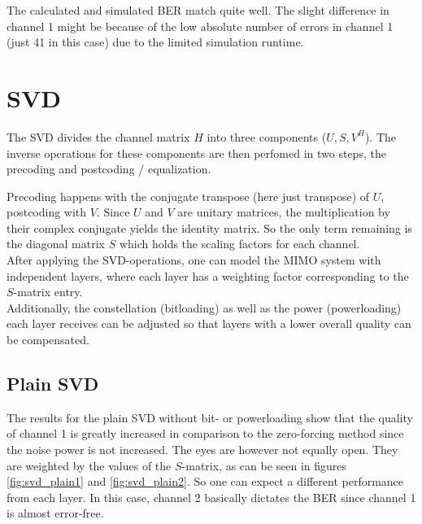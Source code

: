 \documentclass[10pt, a4paper]{article}
\begin{document}
The calculated and simulated BER match quite well. The slight difference in channel 1 might be because of the low absolute number of errors in channel 1 (just 41 in this case) due to the limited simulation runtime.



\section{SVD}
The SVD divides the channel matrix $H$ into three components ($U, S, V^{H}$). The inverse operations for these components are then perfomed in two steps, the precoding and postcoding / equalization.

Precoding happens with the conjugate transpose (here just transpose) of $U$, postcoding with $V$. Since $U$ and $V$ are unitary matrices, the multiplication by their complex conjugate yields the identity matrix. So the only term remaining is the diagonal matrix $S$ which holds the scaling factors for each channel.\\

After applying the SVD-operations, one can model the MIMO system with independent layers, where each layer has a weighting factor corresponding to the $S$-matrix entry.\\

Additionally, the constellation (bitloading) as well as the power (powerloading) each layer receives can be adjusted so that layers with a lower overall quality can be compensated.

\subsection{Plain SVD}
The results for the plain SVD without bit- or powerloading show that the quality of channel 1 is greatly increased in comparison to the zero-forcing method since the noise power is not increased. The eyes are however not equally open. They are weighted by the values of the $S$-matrix, as can be seen in figures \ref{fig:svd_plain1} and \ref{fig:svd_plain2}.
So one can expect a different performance from each layer. In this case, channel 2 basically dictates the BER since channel 1 is almost error-free.
\end{document}
